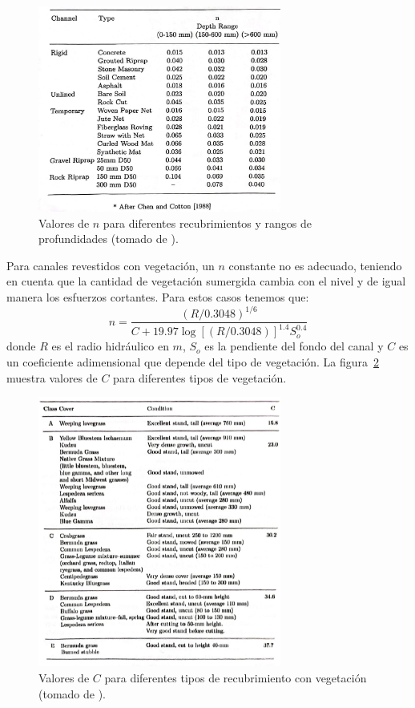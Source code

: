 \documentclass[11pt, oneside]{article}
\begin{document}
\begin{figure}[h]
\centering
\includegraphics[width=8cm]{tab42.jpeg}
\caption{Valores de $n$ para diferentes recubrimientos y rangos de profundidades (tomado de \cite{Chau}).}
\label{fig5}
\end{figure}

Para canales revestidos con vegetaci\'on, un $n$ constante no es adecuado, teniendo en cuenta que la cantidad de vegetaci\'on sumergida cambia con el nivel y de igual manera los esfuerzos cortantes. Para estos casos tenemos que:
$$
n=\frac{\left( R/0.3048 \right)^{1/6}}{C + 19.97 \log \left[ \left( R/0.3048 \right) \right]^{1.4} S_o^{0.4}}
$$
donde $R$ es el radio hidráulico en $m$, $S_o$ es la pendiente del fondo del canal y $C$ es un coeficiente adimensional que depende del tipo de vegetaci\'on. La figura~\ref{fig6} muestra valores de $C$ para diferentes tipos de vegetaci\'on. 

\begin{figure}[h]
\centering
\includegraphics[width=8cm]{tab43.jpeg}
\caption{Valores de $C$ para diferentes tipos de recubrimiento con vegetaci\'on (tomado de \cite{Chau}).}
\label{fig6}
\end{figure}
\end{document}
